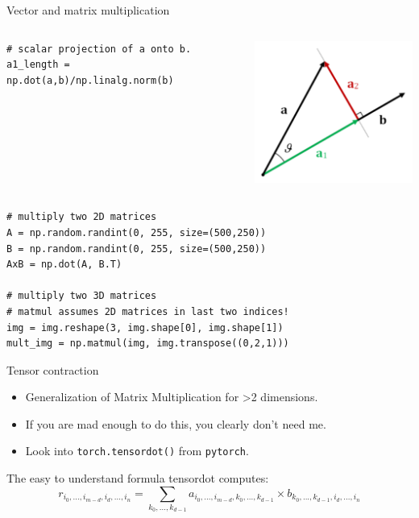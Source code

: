 \documentclass[compress%
,aspectratio=169%
]{beamer}
\newcommand{\code}{\lstinline}
\begin{document}
\begin{frame}[fragile]{Vector and matrix multiplication}
    
\begin{columns}
\begin{lstlisting}
# scalar projection of a onto b.
a1_length = np.dot(a,b)/np.linalg.norm(b)
\end{lstlisting}
\includegraphics[width=0.8\linewidth]{img/scalar_projection.png}
\end{columns}

\begin{lstlisting}
# multiply two 2D matrices
A = np.random.randint(0, 255, size=(500,250)) 
B = np.random.randint(0, 255, size=(500,250))
AxB = np.dot(A, B.T)

# multiply two 3D matrices
# matmul assumes 2D matrices in last two indices!
img = img.reshape(3, img.shape[0], img.shape[1])
mult_img = np.matmul(img, img.transpose((0,2,1)))
\end{lstlisting}
\end{frame}

\begin{frame}{Tensor contraction}
\begin{itemize}
    \item Generalization of Matrix Multiplication for >2 dimensions.
    \item If you are mad enough to do this, you clearly don't need me.
    \item Look into \code{torch.tensordot()} from \code{pytorch}.
\end{itemize}
The easy to understand formula tensordot computes:
$$r_{i_0,...,i_{m-d}, i_d,...,i_n} = \sum_{k_0,...,k_{d-1}} a_{i_0,...,i_{m-d},k_0,...,k_{d-1}} \times b_{k_0,...,k_{d-1}, i_d,...,i_n}$$
\end{frame}
\end{document}
